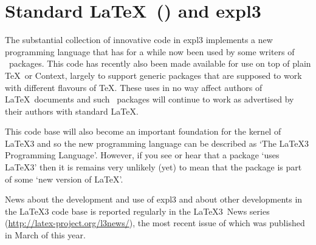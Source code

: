 \documentclass{ltnews}
\begin{document}
\vfill

\section{Standard \LaTeX\ (\LaTeXe) and \textsf{expl3}}

The substantial collection of innovative code in \textsf{expl3}
implements a new programming language that has for a while now been
used by some writers of \LaTeXe\ packages.  This code has recently
also been made available for use on top of plain \TeX\ or {Context},
largely to support generic packages that are supposed to work with
different flavours of \TeX.  These uses in no way affect authors of
\LaTeX\ documents and such \LaTeXe\ packages will continue to work as
advertised by their authors with standard \LaTeX.

This code base will also become an important foundation for the kernel
of \LaTeX3 and so the new programming language can be described as
`The \LaTeX3 Programming Language'. However, if you see or hear that a
package `uses \LaTeX3' then it is remains very unlikely (yet) to mean
that the package is part of some `new version of \LaTeX'.

News about the development and use of \textsf{expl3} and about other
developments in the \LaTeX3 code base is reported regularly in the
\LaTeX3~News series (\url{http://latex-project.org/l3news/}), the most
recent issue of which was published in March of this year.
\end{document}
